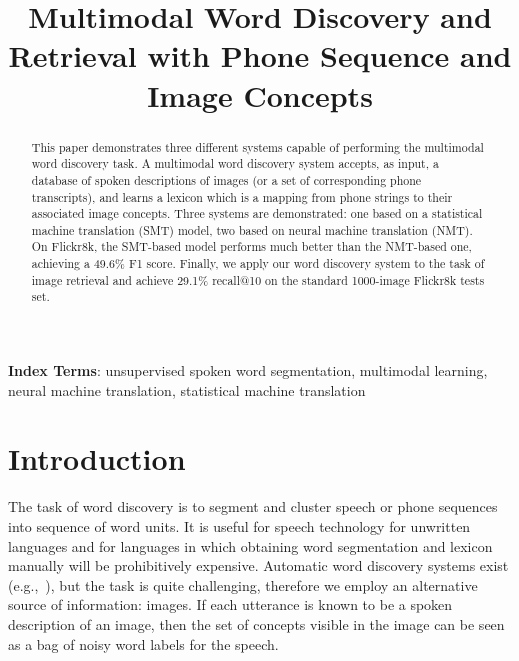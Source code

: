 \documentclass[a4paper]{article}
\title{Multimodal Word Discovery and Retrieval with Phone Sequence and Image Concepts}
\begin{document}
\maketitle
% 
\begin{abstract}
  This paper demonstrates three different systems capable of performing the multimodal word discovery task.  A multimodal word discovery system accepts, as input, a database of spoken descriptions of images (or a set of corresponding phone transcripts), and learns a lexicon which is a mapping from phone strings to their associated image concepts.  Three systems are demonstrated: one based on a statistical machine translation (SMT) model, two based on neural machine translation (NMT).  On Flickr8k, the SMT-based model performs much better than the NMT-based one, achieving a 49.6\% F1 score. Finally, we apply our word discovery system to the task of image retrieval and achieve 29.1\% recall@10 on the standard 1000-image Flickr8k tests set. 
\end{abstract}
\noindent\textbf{Index Terms}: unsupervised spoken word segmentation, multimodal learning, neural machine translation, statistical machine translation

\section{Introduction}
The task of word discovery is to segment and cluster speech or phone sequences into sequence of word units. It is useful for speech technology for unwritten languages and for languages in which obtaining word segmentation and lexicon manually will be prohibitively expensive.  Automatic word discovery systems exist (e.g.,~\cite{Rasanen2015,Bharadwaj2013,Kamper2017}), but the task is quite challenging, therefore we employ an 
alternative source of information: images.
If each utterance is known to be a spoken description of an image, then the set of concepts visible in the image can be seen as a bag of noisy word labels for the speech.
\end{document}

